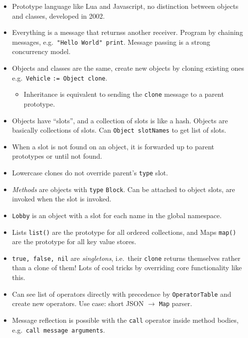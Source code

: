 \documentclass[10pt, twocolumn, landscape]{article}
\begin{document}
\begin{itemize}
    \item Prototype language like Lua and Javascript, no distinction between
        objects and classes, developed in 2002.
    \item Everything is a message that returnss another receiver. Program by
        chaining messages, e.g.\ \texttt{"Hello World" print}. Message passing
        is a strong concurrency model.
    \item Objects and classes are the same, create new objects by cloning
        existing ones e.g.\ \texttt{Vehicle} \texttt{:= Object clone}.
        \begin{itemize}
            \item Inheritance is equivalent to sending the \texttt{clone}
                message to a parent prototype.
        \end{itemize}
    \item Objects have ``slots'', and a collection of slots is like a hash.
        Objects are basically collections of slots. Can \texttt{Object
        slotNames} to get list of slots.
    \item When a slot is not found on an object, it is forwarded up to parent
        prototypes or until not found.
    \item Lowercase clones do not override parent's \texttt{type} slot.
    \item \emph{Methods} are objects with \texttt{type} \texttt{Block}. Can be
        attached to object slots, are invoked when the slot is invoked.
    \item \texttt{Lobby} is an object with a slot for each name in the global
        namespace.
    \item Lists \texttt{list()} are the prototype for all ordered collections,
        and Maps \texttt{map()} are the prototype for all key value stores.
    \item \texttt{true, false, nil} are \emph{singletons}, i.e.\ their
        \texttt{clone} returns themselves rather than a clone of them! Lots of
        cool tricks by overriding core functionality like this.
    \item Can see list of operators directly with precedence by
        \texttt{OperatorTable} and create new operators. Use case: short JSON
        $\to$ \texttt{Map} parser.
    \item Message reflection is possible with the \texttt{call} operator inside
        method bodies, e.g.\ \texttt{call message arguments}.

\end{itemize}
\end{document}
